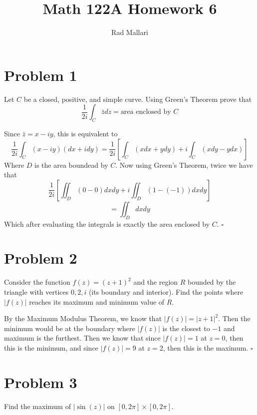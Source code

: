 \documentclass[12pt]{article}
\title{Math 122A Homework 6}
\author{Rad Mallari}
\newenvironment{proof}{\noindent{\bf Proof.}}{\hfill $\square$\medskip}
\begin{document}
\maketitle


\section{Problem 1}
Let $C$ be a closed, positive, and simple curve. Using Green's Theorem prove that
$$\frac{1}{2i}\int_{C}\bar{z}dz=\text{area enclosed by }C$$

\begin{proof}
    Since $\bar{z}=x-iy$, this is equivalent to
    $$\frac{1}{2i}\int_{C}(x-iy)(dx+idy)=\frac{1}{2i}\left
        [\int_{C}(xdx+ydy)+i\int_{C}(xdy-ydx)\right ]$$ Where $D$ is the area
    boundead by $C$. Now using Green's Theorem, twice we have that
    $$\frac{1}{2i}\left[\iint_{D}(0-0)dxdy+i\iint_{D}(1-(-1))dxdy\right]$$
    $$=\iint_{D}dxdy$$ Which after evaluating the integrals is exactly the area
    enclosed by $C$.
\end{proof}


\newpage
\section{Problem 2}
Consider the function $f(z)=(z+1)^{2}$ and the region $R$ bounded by the
triangle with vertices $0,2,i$ (its boundary and interior). Find the points
where $\left |f(z)\right |$ reaches its maximum and minimum value of $R$.

\begin{proof}
    By the Maximum Modulus Theorem, we know that
    $\left|f(z)\right|=\left|z+1\right|^2$. Then the minimum would be at the
    boundary where $\left|f(z)\right|$ is the closest to $-1$ and maximum is the
    furthest. Then we know that since $\left|f(z)\right|=1$ at $z=0$, then this
    is the minimum, and since $\left|f(z)\right|=9$ at $z=2$, then this is the
    maximum.
\end{proof}


\section{Problem 3}
Find the maximum of $\left |\sin(z)\right |$ on $[0,2\pi]\times[0,2\pi]$.
\end{document}

